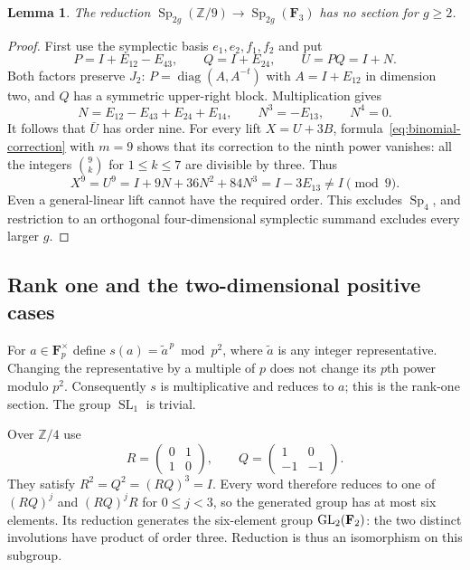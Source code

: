 \documentclass[11pt]{article}
\newcommand{\Fp}{\mathbf F_p}\newcommand{\OO}{\mathcal O}
\DeclareMathOperator{\SL}{SL}\DeclareMathOperator{\Sp}{Sp}
\newtheorem{lemma}[theorem]{Lemma}\newtheorem{proposition}[theorem]{Proposition}
\theoremstyle{definition}\newtheorem{definition}[theorem]{Definition}
\theoremstyle{remark}\newtheorem{remark}[theorem]{Remark}
\begin{document}
\begin{lemma}\label{lem:sp-three}
The reduction $\Sp_{2g}(\mathbb Z/9)\to\Sp_{2g}(\mathbf F_3)$ has no
section for $g\geq2$.
\end{lemma}
\begin{proof}
First use the symplectic basis $e_1,e_2,f_1,f_2$ and put
\[
 P=I+E_{12}-E_{43},\qquad Q=I+E_{24},\qquad U=PQ=I+N.
\]
Both factors preserve $J_2$: $P=\operatorname{diag}(A,A^{-t})$ with
$A=I+E_{12}$ in dimension two, and $Q$ has a symmetric upper-right block.
Multiplication gives
\[
 N=E_{12}-E_{43}+E_{24}+E_{14},\qquad N^3=-E_{13},\qquad N^4=0.
\]
It follows that $\bar U$ has order nine. For every lift $X=U+3B$,
formula~\eqref{eq:binomial-correction} with $m=9$ shows that its correction
to the ninth power vanishes: all the integers $\binom9k$ for
$1\leq k\leq7$ are divisible by three. Thus
\[
 X^9=U^9=I+9N+36N^2+84N^3=I-3E_{13}\ne I\pmod9.
\]
Even a general-linear lift cannot have the required order. This excludes
$\Sp_4$, and restriction to an orthogonal four-dimensional symplectic
summand excludes every larger $g$.
\end{proof}

\subsection{Rank one and the two-dimensional positive cases}

For $a\in\Fp^\times$ define $s(a)=\widetilde a^{\,p}\bmod p^2$, where
$\widetilde a$ is any integer representative. Changing the representative
by a multiple of $p$ does not change its $p$th power modulo $p^2$.
Consequently $s$ is multiplicative and reduces to $a$; this is the
rank-one section. The group $\SL_1$ is trivial.

Over $\mathbb Z/4$ use
\[
 R=\begin{pmatrix}0&1\\1&0\end{pmatrix},\qquad
 Q=\begin{pmatrix}1&0\\-1&-1\end{pmatrix}.
\]
They satisfy $R^2=Q^2=(RQ)^3=I$. Every word therefore reduces to one of
$(RQ)^j$ and $(RQ)^jR$ for $0\leq j<3$, so the generated group has at
most six elements. Its reduction generates the six-element group
$\operatorname{GL}_2(\mathbf F_2)$: the two distinct involutions have product of order
three. Reduction is thus an isomorphism on this subgroup.
\end{document}
